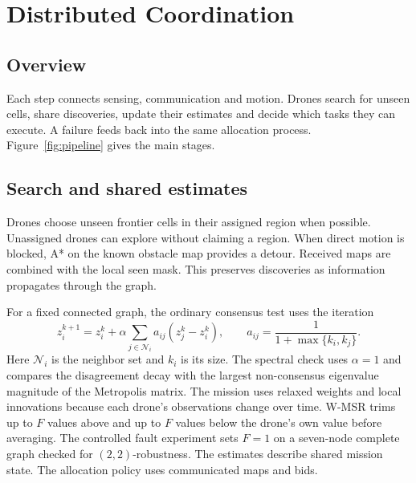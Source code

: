 \chapter{Distributed Coordination}
\section{Overview}
Each step connects sensing, communication and motion. Drones search for unseen cells, share discoveries, update their estimates and decide which tasks they can execute. A failure feeds back into the same allocation process. Figure~\ref{fig:pipeline} gives the main stages.


\section{Search and shared estimates}
Drones choose unseen frontier cells in their assigned region when possible. Unassigned drones can explore without claiming a region. When direct motion is blocked, A* on the known obstacle map provides a detour. Received maps are combined with the local seen mask. This preserves discoveries as information propagates through the graph.

For a fixed connected graph, the ordinary consensus test uses the iteration
\begin{equation}
z_i^{k+1}=z_i^k+\alpha\sum_{j\in\mathcal N_i}a_{ij}(z_j^k-z_i^k),
\qquad
a_{ij}=\frac{1}{1+\max\{k_i,k_j\}} .
\label{eq:consensus}
\end{equation}
Here $\mathcal N_i$ is the neighbor set and $k_i$ is its size. The spectral check uses $\alpha=1$ and compares the disagreement decay with the largest non-consensus eigenvalue magnitude of the Metropolis matrix. The mission uses relaxed weights and local innovations because each drone's observations change over time. W-MSR trims up to $F$ values above and up to $F$ values below the drone's own value before averaging. The controlled fault experiment sets $F=1$ on a seven-node complete graph checked for $(2,2)$-robustness. The estimates describe shared mission state. The allocation policy uses communicated maps and bids.

